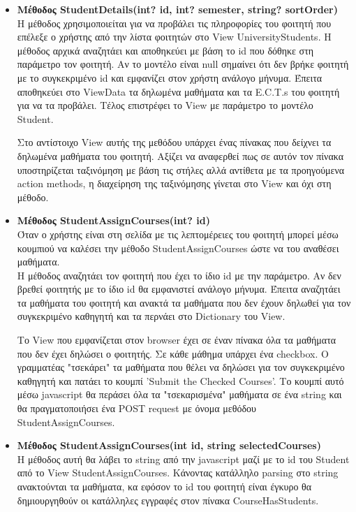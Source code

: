 \documentclass[12pt]{article}
\begin{document}
\begin{itemize}
	\item \textbf{Μέθοδος StudentDetails(int? id, int? semester, string? sortOrder)}\\
	Η μέθοδος χρησιμοποιείται για να προβάλει τις πληροφορίες του φοιτητή που επέλεξε ο χρήστης από την λίστα φοιτητών στο View UniversityStudents. Η μέθοδος αρχικά αναζητάει και αποθηκεύει με βάση το id που δόθηκε στη παράμετρο τον φοιτητή. Αν το μοντέλο είναι null σημαίνει ότι δεν βρήκε φοιτητή με το συγκεκριμένο id και εμφανίζει στον χρήστη ανάλογο μήνυμα. Έπειτα αποθηκεύει στο ViewData τα δηλωμένα μαθήματα και τα E.C.T.s του φοιτητή για να τα προβάλει. Τέλος επιστρέφει το View με παράμετρο το μοντέλο Student.
	
	Στο αντίστοιχο View αυτής της μεθόδου υπάρχει ένας πίνακας που δείχνει τα δηλωμένα μαθήματα του φοιτητή. Αξίζει να αναφερθεί πως σε αυτόν τον πίνακα υποστηρίζεται ταξινόμηση με βάση τις στήλες αλλά αντίθετα με τα προηγούμενα action methods, η διαχείρηση της ταξινόμησης γίνεται στο View και όχι στη μέθοδο.
		
	\item \textbf{Μέθοδος StudentAssignCourses(int? id)}\\
	Όταν ο χρήστης είναι στη σελίδα με τις λεπτομέρειες του φοιτητή μπορεί μέσω κουμπιού να καλέσει την μέθοδο StudentAssignCourses ώστε να του αναθέσει μαθήματα.\\
	Η μέθοδος αναζητάει τον φοιτητή που έχει το ίδιο id με την παράμετρο. Αν δεν βρεθεί φοιτητής με το ίδιο id θα εμφανιστεί ανάλογο μήνυμα. Έπειτα αναζητάει τα μαθήματα του φοιτητή και ανακτά τα μαθήματα που δεν έχουν δηλωθεί για τον συγκεκριμένο καθηγητή και τα περνάει στο Dictionary του View.
	
	Το View που εμφανίζεται στον browser έχει σε έναν πίνακα όλα τα μαθήματα που δεν έχει δηλώσει ο φοιτητής. Σε κάθε μάθημα υπάρχει ένα checkbox. O γραμματέας "τσεκάρει" τα μαθήματα που θέλει να δηλώσει για τον συγκεκριμένο καθηγητή και πατάει το κουμπί 'Submit the Checked Courses'. Το κουμπί αυτό μέσω javascript θα περάσει όλα τα "τσεκαρισμένα" μαθήματα σε ένα string και θα πραγματοποιήσει ένα POST request με όνομα μεθόδου StudentAssignCourses.
			
	\item \textbf{Μέθοδος StudentAssignCourses(int id, string selectedCourses)}\\
	Η μέθοδος αυτή θα λάβει το string από την javascript μαζί με το id του Student από το View StudentAssignCourses. Κάνοντας κατάλληλο parsing στο string ανακτούνται τα μαθήματα, κα εφόσον το id του φοιτητή είναι έγκυρο θα δημιουργηθούν οι κατάλληλες εγγραφές στον πίνακα CourseHasStudents.
	

\end{itemize}
\end{document}
